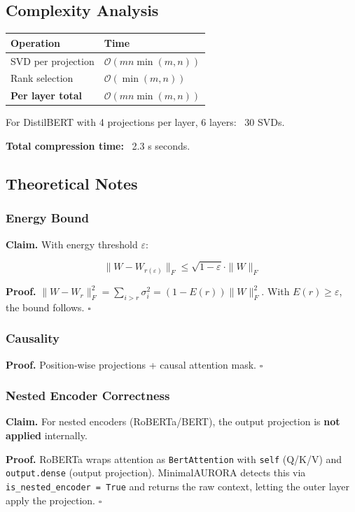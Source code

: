 \subsection{Complexity Analysis}

\begin{table}[H]
\centering
\small
\begin{tabular}{ll}
\toprule
\textbf{Operation} & \textbf{Time} \\
\midrule
SVD per projection & $\mathcal{O}(mn \min(m,n))$ \\
Rank selection & $\mathcal{O}(\min(m,n))$ \\
\textbf{Per layer total} & $\mathcal{O}(mn \min(m,n))$ \\
\bottomrule
\end{tabular}
\end{table}

For DistilBERT with 4 projections per layer, 6 layers: ~30 SVDs.

\textbf{Total compression time:} ~2.3 s seconds.

\subsection{Theoretical Notes}

\subsubsection{Energy Bound}

\textbf{Claim.} With energy threshold $\varepsilon$:

\[
\|W - W_{r(\varepsilon)}\|_F \leq \sqrt{1 - \varepsilon} \cdot \|W\|_F
\tag{4.5}
\]

\textbf{Proof.} $\|W - W_r\|_F^2 = \sum_{i > r} \sigma_i^2 = (1 - E(r)) \|W\|_F^2$. 
With $E(r) \geq \varepsilon$, the bound follows. $\square$

\subsubsection{Causality}

\textbf{Proof.} Position-wise projections + causal attention mask. $\square$

\subsubsection{Nested Encoder Correctness}

\textbf{Claim.} For nested encoders (RoBERTa/BERT), the output projection is 
\textbf{not applied} internally.

\textbf{Proof.} RoBERTa wraps attention as \texttt{BertAttention} with \texttt{self} (Q/K/V) 
and \texttt{output.dense} (output projection). MinimalAURORA detects this via 
\texttt{is\_nested\_encoder = True} and returns the raw context, letting the outer 
layer apply the projection. $\square$

